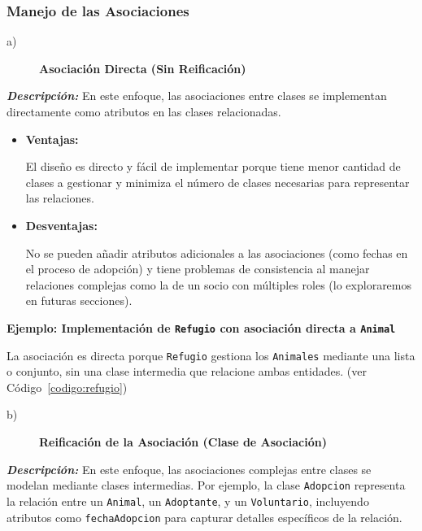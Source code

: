 \subsubsection{Manejo de las Asociaciones}

\begin{description}
    \item[a)] \textbf{Asociación Directa (Sin Reificación)}
\end{description}

\textit{\textbf{Descripción:}}  
En este enfoque, las asociaciones entre clases se implementan directamente como atributos 
en las clases relacionadas.\par

\begin{itemize}
    \item \textbf{Ventajas:}\par
    El diseño es directo y fácil de implementar porque tiene menor cantidad de clases a gestionar 
    y minimiza el número de clases necesarias para representar las relaciones.
    \item \textbf{Desventajas:}\par
    No se pueden añadir atributos adicionales a las asociaciones (como fechas en el proceso 
    de adopción) y tiene problemas de consistencia al manejar relaciones complejas como la 
    de un socio con múltiples roles (lo exploraremos en futuras secciones).

\end{itemize}

\textbf{Ejemplo: Implementación de \texttt{Refugio} con asociación directa a \texttt{Animal}}\par
La asociación es directa porque \texttt{Refugio} gestiona los \texttt{Animales} mediante una 
lista o conjunto, sin una clase intermedia que relacione ambas entidades. (ver Código~\ref{codigo:refugio})

\begin{description}
    \item[b)] \textbf{Reificación de la Asociación (Clase de Asociación)}
\end{description}

\textit{\textbf{Descripción:}}  
En este enfoque, las asociaciones complejas entre clases se modelan mediante clases 
intermedias. Por ejemplo, la clase \texttt{Adopcion} representa la relación entre un 
\texttt{Animal}, un \texttt{Adoptante}, y un \texttt{Voluntario}, incluyendo atributos 
como \texttt{fechaAdopcion} para capturar detalles específicos de la relación.

